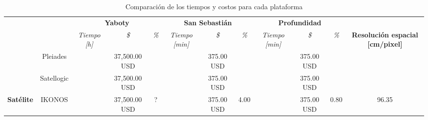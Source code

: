 \begin{table}[]

    \caption{Comparación de los tiempos y costos para cada plataforma}
    \label{tab:tabla}
   
    \begin{tabular}{cc|ccc|ccc|ccc|c|}
    \cline{3-12}
    \multicolumn{2}{c|}{} &
      \multicolumn{3}{c|}{\cellcolor[HTML]{68CBD0}\textbf{Yaboty}} &
      \multicolumn{3}{c|}{\cellcolor[HTML]{68CBD0}\textbf{San   Sebastián}} &
      \multicolumn{3}{c|}{\cellcolor[HTML]{68CBD0}\textbf{Profundidad}} &
       \\ \cline{3-11}
    \multicolumn{2}{c|}{\multirow{-2}{*}{}} &
      \multicolumn{1}{c|}{\cellcolor[HTML]{68CBD0}\textit{Tiempo {[}h{]}}} &
      \multicolumn{1}{c|}{\cellcolor[HTML]{68CBD0}\textit{\$}} &
      \cellcolor[HTML]{68CBD0}\textit{\%} &
      \multicolumn{1}{c|}{\cellcolor[HTML]{68CBD0}\textit{Tiempo {[}min{]}}} &
      \multicolumn{1}{c|}{\cellcolor[HTML]{68CBD0}\textit{\$}} &
      \cellcolor[HTML]{68CBD0}\textit{\%} &
      \multicolumn{1}{c|}{\cellcolor[HTML]{68CBD0}\textit{Tiempo {[}min{]}}} &
      \multicolumn{1}{c|}{\cellcolor[HTML]{68CBD0}\textit{\$}} &
      \cellcolor[HTML]{68CBD0}\textit{\%} &
      \multirow{-2}{*}{\textbf{Resolución espacial {[}cm/pixel{]}}} \\ \hline
    \multicolumn{1}{|c|}{\cellcolor[HTML]{9698ED}} &
      \cellcolor[HTML]{9698ED}Pleiades &
      \multicolumn{1}{c|}{} &
      \multicolumn{1}{c|}{37,500.00 USD} &
       &
      \multicolumn{1}{c|}{} &
      \multicolumn{1}{c|}{375.00 USD} &
       &
      \multicolumn{1}{c|}{} &
      \multicolumn{1}{c|}{375.00 USD} &
       &
       \\ \cline{2-12} 
    \multicolumn{1}{|c|}{\cellcolor[HTML]{9698ED}} &
      \cellcolor[HTML]{9698ED}Satellogic &
      \multicolumn{1}{c|}{} &
      \multicolumn{1}{c|}{37,500.00 USD} &
       &
      \multicolumn{1}{c|}{} &
      \multicolumn{1}{c|}{375.00 USD} &
       &
      \multicolumn{1}{c|}{} &
      \multicolumn{1}{c|}{375.00 USD} &
       &
       \\ \cline{2-12} 
    \multicolumn{1}{|c|}{\multirow{-3}{*}{\cellcolor[HTML]{9698ED}\textbf{Satélite}}} &
      \cellcolor[HTML]{9698ED}IKONOS &
      \multicolumn{1}{c|}{} &
      \multicolumn{1}{c|}{37,500.00 USD} &
      ? &
      \multicolumn{1}{c|}{} &
      \multicolumn{1}{c|}{375.00 USD} &
      4.00 &
      \multicolumn{1}{c|}{} &
      \multicolumn{1}{c|}{375.00 USD} &
      0.80 &
      96.35 \\ \hline

\end{tabular}
\end{table}
